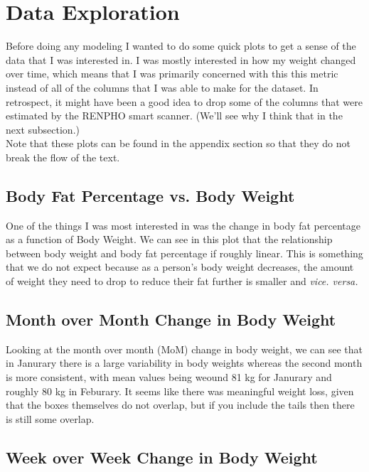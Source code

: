 \documentclass[journal, a4paper]{IEEEtran}
\begin{document}
\section{Data Exploration}

Before doing any modeling I wanted to do some quick plots to get a sense of the data that I was interested in. I was mostly interested in how my weight changed
over time, which means that I was primarily concerned with this this metric instead of all of the columns that I was able to make for the dataset. In 
retrospect, it might have been a good idea to drop some of the columns that were estimated by the RENPHO smart scanner. (We'll see why I think that in the next
subsection.)\\

Note that these plots can be found in the appendix section so that they do not break the flow of the text.

\subsection{Body Fat Percentage vs. Body Weight}

One of the things I was most interested in was the change in body fat percentage as a function of Body Weight. We can see in this plot that the relationship 
between body weight and body fat percentage if roughly linear. This is something that we do not expect because  as a person's body weight decreases, the amount 
of weight they need to drop to reduce their fat further is smaller and \textit{vice. versa.}

\subsection{Month over Month Change in Body Weight}

Looking at the month over month (MoM) change in body weight, we can see that in Janurary there is a large variability in body weights whereas the second month
is more consistent, with mean values being weound 81 kg for Janurary and roughly 80 kg in Feburary. It seems like there was meaningful weight loss, given that 
the boxes themselves do not overlap, but if you include the tails then there is still some overlap.

\subsection{Week over Week Change in Body Weight}
\end{document}
